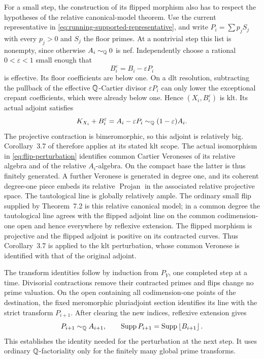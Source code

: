 For a small step, the construction of its flipped morphism also has to
respect the hypotheses of the relative canonical-model theorem.
Use the current representative in
\eqref{eq:running-supported-representative}, and write
\(P_i=\sum p_jS_j\) with every \(p_j>0\) and \(S_j\) the floor primes.
At a nontrivial step this list is nonempty, since otherwise
\(A_i\sim_\mathbb Q0\) is nef.  Independently choose a rational
\(0<\varepsilon<1\) small
enough that
\[
 B_i^\varepsilon=B_i-\varepsilon P_i
\]
is effective.  Its floor coefficients are below one.  On a dlt resolution,
subtracting the pullback of the effective \(\mathbb Q\)-Cartier divisor
\(\varepsilon P_i\) can only lower the exceptional crepant coefficients,
which were already below one.  Hence \((X_i,B_i^\varepsilon)\) is klt.
Its actual adjoint satisfies
\begin{equation}\label{eq:flip-perturbation}
 K_{X_i}+B_i^\varepsilon=A_i-\varepsilon P_i
 \sim_\mathbb Q(1-\varepsilon)A_i.
\end{equation}
The projective contraction is bimeromorphic, so this adjoint is relatively
big.  Corollary~3.7 of \cite{DasHaconPaun2024} therefore applies at its
stated klt scope.  The actual isomorphism in \eqref{eq:flip-perturbation}
identifies common Cartier Veroneses of its relative algebra and of the
relative \(A_i\)-algebra.  On the compact base the latter is thus finitely
generated.  A further Veronese is generated in degree one, and its coherent
degree-one piece embeds its relative \(\operatorname{Projan}\) in the
associated relative projective space.  The tautological line is globally
relatively ample.  The ordinary small flip supplied by Theorem~7.2 is
this relative canonical model; in a common degree the tautological line
agrees with the flipped adjoint line on the common codimension-one open
and hence everywhere by reflexive extension.  The flipped morphism is
projective and the flipped adjoint is positive on its contracted curves.
Thus Corollary~3.7 is applied to the klt perturbation, whose common
Veronese is identified with that of the original adjoint.

The transform identities follow by induction from \(P_Y\), one completed
step at a time.  Divisorial contractions
remove their contracted primes and flips change no prime valuation.  On
the open containing all codimension-one points of the destination, the
fixed meromorphic pluriadjoint section identifies its line with the
strict transform \(P_{i+1}\).  After clearing the new indices, reflexive
extension gives
\[
 P_{i+1}\sim_\mathbb Q A_{i+1},\qquad
 \operatorname{Supp} P_{i+1}=\operatorname{Supp}\left\lfloor B_{i+1}\right\rfloor.
\]
This establishes the identity needed for the perturbation at the next
step.  It uses ordinary \(\mathbb Q\)-factoriality only for the finitely many
global prime transforms.

